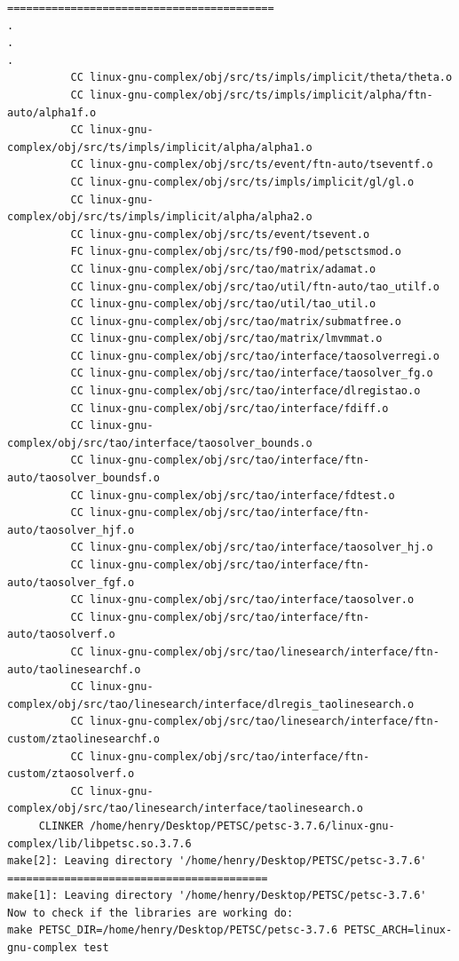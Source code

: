 \documentclass{article}
\begin{document}
\begin{enumerate}
\begin{verbatim}
==========================================
.
.
.
          CC linux-gnu-complex/obj/src/ts/impls/implicit/theta/theta.o
          CC linux-gnu-complex/obj/src/ts/impls/implicit/alpha/ftn-auto/alpha1f.o
          CC linux-gnu-complex/obj/src/ts/impls/implicit/alpha/alpha1.o
          CC linux-gnu-complex/obj/src/ts/event/ftn-auto/tseventf.o
          CC linux-gnu-complex/obj/src/ts/impls/implicit/gl/gl.o
          CC linux-gnu-complex/obj/src/ts/impls/implicit/alpha/alpha2.o
          CC linux-gnu-complex/obj/src/ts/event/tsevent.o
          FC linux-gnu-complex/obj/src/ts/f90-mod/petsctsmod.o
          CC linux-gnu-complex/obj/src/tao/matrix/adamat.o
          CC linux-gnu-complex/obj/src/tao/util/ftn-auto/tao_utilf.o
          CC linux-gnu-complex/obj/src/tao/util/tao_util.o
          CC linux-gnu-complex/obj/src/tao/matrix/submatfree.o
          CC linux-gnu-complex/obj/src/tao/matrix/lmvmmat.o
          CC linux-gnu-complex/obj/src/tao/interface/taosolverregi.o
          CC linux-gnu-complex/obj/src/tao/interface/taosolver_fg.o
          CC linux-gnu-complex/obj/src/tao/interface/dlregistao.o
          CC linux-gnu-complex/obj/src/tao/interface/fdiff.o
          CC linux-gnu-complex/obj/src/tao/interface/taosolver_bounds.o
          CC linux-gnu-complex/obj/src/tao/interface/ftn-auto/taosolver_boundsf.o
          CC linux-gnu-complex/obj/src/tao/interface/fdtest.o
          CC linux-gnu-complex/obj/src/tao/interface/ftn-auto/taosolver_hjf.o
          CC linux-gnu-complex/obj/src/tao/interface/taosolver_hj.o
          CC linux-gnu-complex/obj/src/tao/interface/ftn-auto/taosolver_fgf.o
          CC linux-gnu-complex/obj/src/tao/interface/taosolver.o
          CC linux-gnu-complex/obj/src/tao/interface/ftn-auto/taosolverf.o
          CC linux-gnu-complex/obj/src/tao/linesearch/interface/ftn-auto/taolinesearchf.o
          CC linux-gnu-complex/obj/src/tao/linesearch/interface/dlregis_taolinesearch.o
          CC linux-gnu-complex/obj/src/tao/linesearch/interface/ftn-custom/ztaolinesearchf.o
          CC linux-gnu-complex/obj/src/tao/interface/ftn-custom/ztaosolverf.o
          CC linux-gnu-complex/obj/src/tao/linesearch/interface/taolinesearch.o
     CLINKER /home/henry/Desktop/PETSC/petsc-3.7.6/linux-gnu-complex/lib/libpetsc.so.3.7.6
make[2]: Leaving directory '/home/henry/Desktop/PETSC/petsc-3.7.6'
=========================================
make[1]: Leaving directory '/home/henry/Desktop/PETSC/petsc-3.7.6'
Now to check if the libraries are working do:
make PETSC_DIR=/home/henry/Desktop/PETSC/petsc-3.7.6 PETSC_ARCH=linux-gnu-complex test
\end{verbatim}

\end{enumerate}
\end{document}
